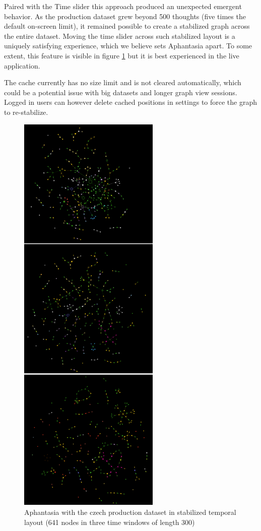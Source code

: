 Paired with the Time slider this approach produced an unexpected emergent behavior. As the \gls{production} dataset grew beyond 500 thoughts (five times the default on-screen limit), it remained possible to create a stabilized graph across the entire dataset.
Moving the time slider across such stabilized layout is a uniquely satisfying experience, which we believe sets Aphantasia apart.
To some extent, this feature is visible in figure \ref{obr:afantazie_production_dataset_in_time_window} but it is best experienced in the live application.

The cache currently has no size limit and is not cleared automatically, which could be a potential issue with big datasets and longer graph view sessions.
Logged in users can however delete cached positions in settings to force the graph to re-stabilize.

\begin{figure}[p]
    \includegraphics[height=200mm, keepaspectratio]{img/afantazie_production_dataset_in_time_window.png}
    \caption{Aphantasia with the czech production dataset in stabilized temporal layout (641 nodes in three time windows of length 300)}
    \label{obr:afantazie_production_dataset_in_time_window}
\end{figure}

